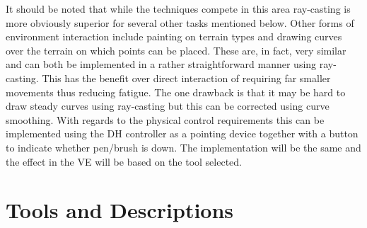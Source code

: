 \documentclass{sig-alternate-05-2015}
\begin{document}
It should be noted that while the techniques compete in this area ray-casting is more obviously superior for several other tasks mentioned below.
Other forms of environment interaction include painting on terrain types and drawing curves over the terrain on which points can be placed. These are, in fact, very similar and can both be implemented in a rather straightforward manner using ray-casting. This has the benefit over direct interaction of requiring far smaller movements thus reducing fatigue. The one drawback is that it may be hard to draw steady curves using ray-casting but this can be corrected using curve smoothing. With regards to the physical control requirements this can be implemented using the DH controller as a pointing device together with a button to indicate whether pen/brush is down. The implementation will be the same and the effect in the VE will be based on the tool selected.
\section{Tools and Descriptions}
\end{document}
